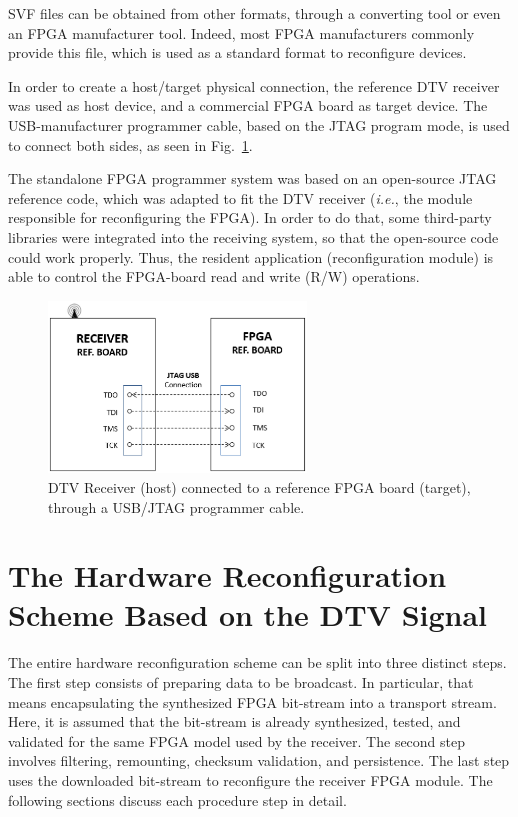 SVF files can be obtained from other formats, through a converting tool or even an FPGA manufacturer tool. Indeed, most FPGA manufacturers commonly provide this file, which is used as a standard format to reconfigure devices.

In order to create a host/target physical connection, the reference DTV receiver was used as host device, and a commercial FPGA board as target device. The USB-manufacturer programmer cable, based on the JTAG program mode, is used to connect both sides, as seen in Fig.~\ref{figure:fig4}.

The standalone FPGA programmer system was based on an open-source JTAG reference code, which was adapted to fit the DTV receiver ({\em i.e.}, the module responsible for reconfiguring the FPGA). In order to do that, some third-party libraries were integrated into the receiving system, so that the open-source code could work properly. Thus, the resident application (reconfiguration module) is able to control the FPGA-board read and write (R/W) operations.

%
\begin{figure}[ht]
\centering
\includegraphics[width=2.7in]{images/Fig4.eps}
\caption{DTV Receiver (host) connected to a reference FPGA board (target), through a USB/JTAG programmer cable.}
\label{figure:fig4}
\end{figure}
%

\section{The Hardware Reconfiguration Scheme Based on the DTV Signal}
\label{hardware-reconfig}

The entire hardware reconfiguration scheme can be split into three distinct steps. The first step consists of preparing data to be broadcast. In particular, that means encapsulating the synthesized FPGA bit-stream into a transport stream. Here, it is assumed that the bit-stream is already synthesized, tested, and validated for the same FPGA model used by the receiver. The second step involves filtering, remounting, checksum validation, and persistence. The last step uses the downloaded bit-stream to reconfigure the receiver FPGA module. 
The following sections discuss each procedure step in detail.

